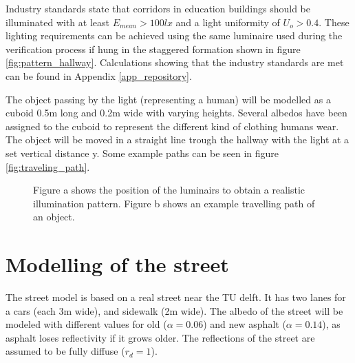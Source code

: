 Industry standards state that corridors in education buildings should be illuminated with at least $E_{mean} > 100lx$ and a light uniformity of $U_o > 0.4$\cite{lichthandbuch}. These lighting requirements can be achieved using the same luminaire used during the verification process if hung in the staggered formation shown in figure \ref{fig:pattern_hallway}. Calculations showing that the industry standards are met can be found in Appendix \ref{app_repository}.

The object passing by the light (representing a human) will be modelled as a cuboid 0.5m long and 0.2m wide with varying heights. Several albedos have been assigned to the cuboid to represent the different kind of clothing humans wear. The object will be moved in a straight line trough the hallway with the light at a set vertical distance y. Some example paths can be seen in figure \ref{fig:traveling_path}.

\begin{figure}
	\centering     %
	\caption{Figure a shows the position of the luminairs to obtain a realistic illumination pattern. Figure b shows an example travelling path of an object.}
\end{figure}

\section{Modelling of the street}
The street model is based on a real street near the TU delft. It has two lanes for a cars (each 3m wide), and sidewalk (2m wide). The albedo of the street will be modeled with different values for old ($\alpha = 0.06$) and new asphalt ($\alpha = 0.14$), as asphalt loses reflectivity if it grows older\cite{Albedo}. The reflections of the street are assumed to be fully diffuse ($r_d = 1$).

